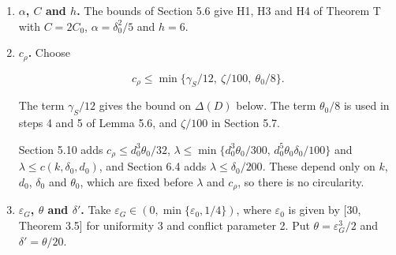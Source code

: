 \documentclass[english,11pt,a4paper]{article}
\providecommand{\tightlist}{\setlength{\itemsep}{0pt}\setlength{\parskip}{0pt}}
\begin{document}
\begin{enumerate}
  \[\lambda\le\min\Big\{\frac{\gamma_S}{36},\ \frac{\delta_0}{18(J+1)},\ \frac{\theta_0\delta_0}{200},\ \sqrt{\frac{\zeta}{40(J+B)}}\Big\},\]

  and put \(\eta_T=\lambda^2/256\). The four terms are used as follows.

  \begin{itemize}
  \tightlist
  \item
    \(\gamma_S/36\) gives \(\Delta(E_X)\le9\lambda m\le\gamma_S m/4\) in the bound on \(\Delta(D\cup E_X)\) below.
  \item
    \(\delta_0/(18(J+1))\) is the vertex budget of the exchange pools {[}10, §4.1{]}: each independent coordinate uses its own pools, so the union of the footprints has maximum degree at most \(9p_X\).
  \item
    \(\theta_0\delta_0/200\) bounds the exclusions caused by \(E_X\) in steps 4 and 5 of Lemma 5.6; it implies \(\lambda\le\theta_0/72\).
  \item
    \(\sqrt{\zeta/(40(J+B))}\) keeps the centered residual of Lemma 5.10 inside its margin: the high halves contain at most \(9Jp_X^2\) blocks of any one type, and the shift \(s_i/2\le p_X^2/2\) is extended with entries at most \(Bp_X^2/2\).
  \end{itemize}

  In Sections 5.8--5.10 and 6, \(J\) and \(B\) are those of the section.
\item
  \textbf{\(\alpha\), \(C\) and \(h\).} The bounds of Section 5.6 give H1, H3 and H4 of Theorem T with \(C=2C_0\), \(\alpha=\delta_0^2/5\) and \(h=6\).
\item
  \textbf{\(c_\rho\).} Choose

  \[c_\rho\le\min\{\gamma_S/12,\ \zeta/100,\ \theta_0/8\}.\]

  The term \(\gamma_S/12\) gives the bound on \(\Delta(D)\) below. The term \(\theta_0/8\) is used in steps 4 and 5 of Lemma 5.6, and \(\zeta/100\) in Section 5.7.

  Section 5.10 adds \(c_\rho\le d_0^3\theta_0/32\), \(\lambda\le\min\{d_0^3\theta_0/300,\,d_0^5\theta_0\delta_0/100\}\) and \(\lambda\le c(k,\delta_0,d_0)\), and Section 6.4 adds \(\lambda\le\delta_0/200\). These depend only on \(k\), \(d_0\), \(\delta_0\) and \(\theta_0\), which are fixed before \(\lambda\) and \(c_\rho\), so there is no circularity.
\item
  \textbf{\(\varepsilon_G\), \(\theta\) and \(\delta'\).} Take \(\varepsilon_G\in(0,\min\{\varepsilon_0,1/4\})\), where \(\varepsilon_0\) is given by {[}30, Theorem 3.5{]} for uniformity 3 and conflict parameter 2. Put \(\theta=\varepsilon_G^3/2\) and \(\delta'=\theta/20\).
\end{enumerate}
\end{document}
